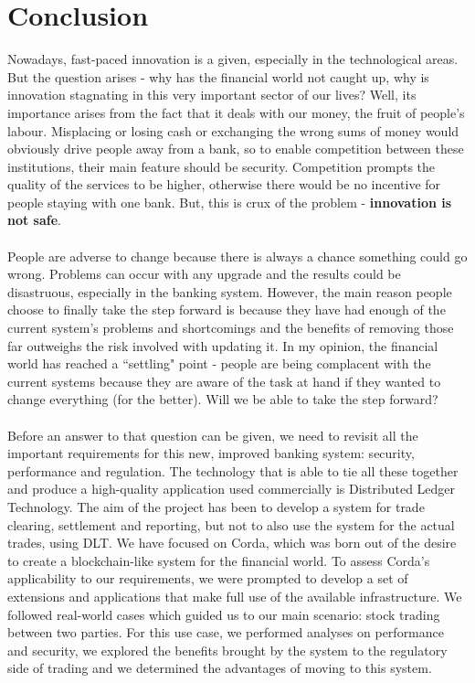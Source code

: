\documentclass[12pt,twoside]{article}
\begin{document}
\section{Conclusion}
\label{sec:Conclusion}
Nowadays, fast-paced innovation is a given, especially in the technological areas. But the question arises - why has the financial world not caught up, why is innovation stagnating in this very important sector of our lives? Well, its importance arises from the fact that it deals with our money, the fruit of people's labour. Misplacing or losing cash or exchanging the wrong sums of money would obviously drive people away from a bank, so to enable competition between these institutions, their main feature should be security. Competition prompts the quality of the services to be higher, otherwise there would be no incentive for people staying with one bank. But, this is crux of the problem - \textbf{innovation is not safe}. 
\\ \\
People are adverse to change because there is always a chance something could go wrong. Problems can occur with any upgrade and the results could be disastruous, especially in the banking system. However, the main reason people choose to finally take the step forward is because they have had enough of the current system's problems and shortcomings and the benefits of removing those far outweighs the risk involved with updating it. In my opinion, the financial world has reached a ``settling" point - people are being complacent with the current systems because they are aware of the task at hand if they wanted to change everything (for the better). Will we be able to take the step forward?
\\ \\
Before an answer to that question can be given, we need to revisit all the important requirements for this new, improved banking system: security, performance and regulation.  The technology that is able to tie all these together and produce a high-quality application used commercially is Distributed Ledger Technology. The aim of the project has been to develop a system for trade clearing, settlement and reporting, but not to also use the system for the actual trades, using DLT. We have focused on Corda, which was born out of the desire to create a blockchain-like system for the financial world. To assess Corda's applicability to our requirements, we were prompted to develop a set of extensions and applications that make full use of the available infrastructure. We followed real-world cases which guided us to our main scenario: stock trading between two parties. For this use case, we performed analyses on performance and security, we explored the benefits brought by the system to the regulatory side of trading and we determined the advantages of moving to this system.
\end{document}

